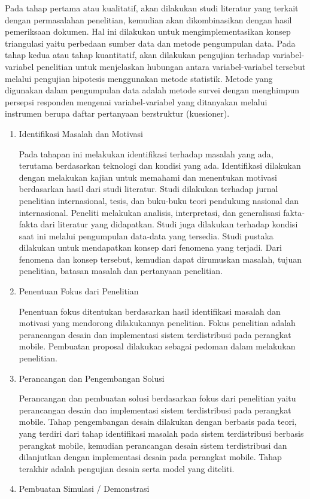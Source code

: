 Pada tahap pertama atau kualitatif, akan dilakukan studi literatur yang terkait dengan permasalahan penelitian, kemudian akan dikombinasikan dengan hasil pemeriksaan dokumen. Hal ini dilakukan untuk mengimplementasikan konsep triangulasi yaitu perbedaan sumber data dan metode pengumpulan data. Pada tahap kedua atau tahap kuantitatif, akan dilakukan pengujian terhadap variabel-variabel penelitian untuk menjelaskan hubungan antara variabel-variabel tersebut melalui pengujian hipotesis menggunakan metode statistik. Metode yang digunakan dalam pengumpulan data adalah metode survei dengan menghimpun persepsi responden mengenai variabel-variabel yang ditanyakan melalui instrumen berupa daftar pertanyaan berstruktur (kuesioner).
\begin{enumerate}
\item Identifikasi Masalah dan Motivasi

Pada tahapan ini melakukan identifikasi terhadap masalah yang ada, terutama berdasarkan teknologi dan kondisi yang ada. Identifikasi dilakukan dengan melakukan kajian untuk memahami dan menentukan motivasi berdasarkan hasil dari studi literatur. Studi dilakukan terhadap jurnal penelitian internasional, tesis, dan buku-buku teori pendukung nasional dan internasional. Peneliti melakukan analisis, interpretasi, dan generalisasi fakta-fakta dari literatur yang didapatkan. Studi juga dilakukan terhadap kondisi saat ini melalui pengumpulan data-data yang tersedia. Studi pustaka dilakukan untuk mendapatkan konsep dari fenomena yang terjadi. Dari fenomena dan konsep tersebut, kemudian dapat dirumuskan masalah, tujuan penelitian, batasan masalah dan pertanyaan penelitian.
\item Penentuan Fokus dari Penelitian

Penentuan fokus ditentukan berdasarkan hasil identifikasi masalah dan motivasi yang mendorong dilakukannya penelitian. Fokus penelitian adalah perancangan desain dan implementasi sistem terdistribusi pada perangkat mobile. Pembuatan proposal dilakukan sebagai pedoman dalam melakukan penelitian.
\item Perancangan dan Pengembangan Solusi

Perancangan dan pembuatan solusi berdasarkan fokus dari penelitian yaitu perancangan desain dan implementasi sistem terdistribusi pada perangkat mobile. Tahap pengembangan desain dilakukan dengan berbasis pada teori, yang terdiri dari tahap identifikasi masalah pada sistem terdistribusi berbasis perangkat mobile, kemudian perancangan desain sistem terdistribusi dan dilanjutkan dengan implementasi desain pada perangkat mobile. Tahap terakhir adalah pengujian desain serta model yang diteliti.
\item Pembuatan Simulasi / Demonstrasi


\end{enumerate}
